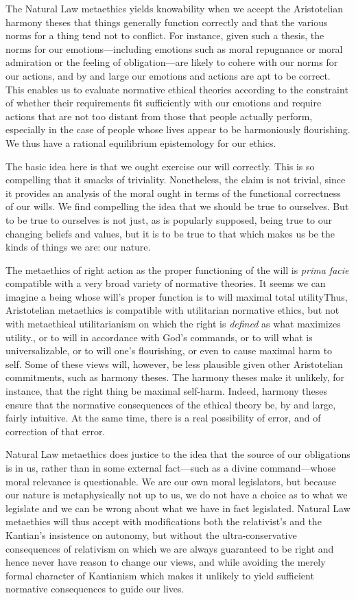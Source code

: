 The Natural Law metaethics yields knowability when we accept the Aristotelian harmony theses that things generally function
correctly and that the various norms for a thing tend not to conflict. For instance, given such a thesis, the norms for our
emotions---including emotions such as moral repugnance or moral admiration or the feeling of obligation---are likely to cohere
with our norms for our actions, and by and large our emotions and actions are apt to be correct. This enables us to evaluate
normative ethical theories according to the constraint of whether their requirements fit sufficiently with our emotions and require
actions that are not too distant from those that people actually perform, especially in the case of people whose lives appear to
be harmoniously flourishing.  We thus have a rational equilibrium epistemology for our ethics.

The basic idea here is that we ought exercise our will correctly. This is so compelling that it smacks of triviality. Nonetheless,
the claim is not trivial, since it provides an analysis of the moral ought in terms of the functional correctness of our wills.
We find compelling the idea that we should be true to ourselves. But to be true to ourselves is not just, as is popularly supposed,
being true to our changing beliefs and values, but it is to be true to that which makes us be the kinds of things we are: our nature.

The metaethics of right action as the proper functioning of the will is \textit{prima facie} compatible with a very broad variety of normative theories.
It seems we can imagine a being whose will's proper function is to will maximal total utility{Thus, Aristotelian metaethics is compatible with
utilitarian normative ethics, but not with metaethical utilitarianism on which the right is \textit{defined} as what maximizes utility.}, or to will in accordance with God's commands, or
to will what is universalizable, or to will one's flourishing, or even to cause maximal harm to self. Some of these views will, however, be less
plausible given other Aristotelian commitments, such as harmony theses. The harmony theses make it unlikely, for instance, that the right thing
be maximal self-harm. Indeed, harmony theses ensure that the normative consequences of the ethical theory be, by and large, fairly intuitive.
At the same time, there is a real possibility of error, and of correction of that error.

Natural Law metaethics does justice to the idea that the source of our obligations is in us, rather than in some external fact---such as
a divine command---whose moral relevance is questionable. We are our own moral legislators, but because our nature is metaphysically not
up to us, we do not have a choice as to what we legislate and we can be wrong about what we have in fact legislated. Natural Law
metaethics will thus accept with modifications both the relativist's and the Kantian's insistence on autonomy, but without the
ultra-conservative consequences of relativism on which we are always guaranteed to be right and hence never have reason
to change our views, and while avoiding the merely formal character of Kantianism which makes it unlikely to yield sufficient
normative consequences to guide our lives.

